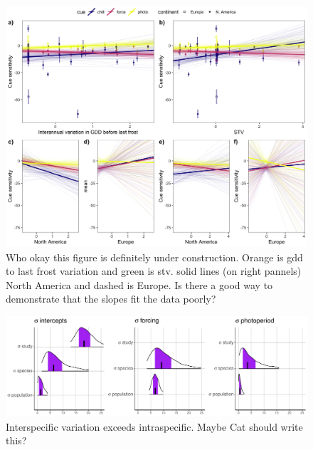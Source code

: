 \documentclass[12pt]{article}\usepackage[]{graphicx}\usepackage[]{color}
\begin{document}
\begin{figure}[h!]
    \centering
 \includegraphics[width=\textwidth]{..//..//analyses/ranges/figures/mock1.jpeg} 
    \caption{Who okay this figure is definitely under construction. Orange is gdd to last frost variation and green is stv. solid lines (on right pannels) North America and dashed is Europe. Is there a good way to demonstrate that the slopes fit the data poorly? }
    \label{fig:mods}
\end{figure}


\begin{figure}[h!]
    \centering
 \includegraphics[width=\textwidth]{..//..//analyses/ranges/figures/variancepartitioning.pdf} 
    \caption{Interspecific variation exceeds intraspecific.  Maybe Cat should write this?}
    \label{fig:popy}
\end{figure}

\pagebreak
\end{document}
